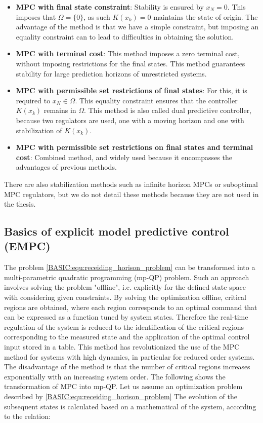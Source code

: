 \begin{itemize}
	\item \textbf{MPC with final state constraint}: Stability is ensured by $x_N=0$. This imposes that $\Omega=\{0\}$, as such $K(x_k)=0$ maintains the state of origin. The advantage of the method is that we have a simple constraint, but imposing an equality constraint can to lead to difficulties in obtaining the solution.
	\item \textbf{MPC with terminal cost}: This method imposes a zero terminal cost, without imposing restrictions
for the final states. This method guarantees stability for large prediction horizons
of unrestricted systems.
	\item \textbf{MPC with permissible set restrictions of final states}: For this, it is required to $x_N\in\Omega$. This equality constraint ensures that the controller $K(x_k)$ remains in $\Omega$. This method is also called dual predictive controller, because two regulators are used, one with a moving horizon and one with stabilization of $K(x_k)$.
	\item \textbf{MPC with permissible set restrictions on final states and terminal cost}: Combined method, and widely used because it encompasses the advantages of previous methods.
\end{itemize}

There are also stabilization methods such as infinite horizon MPCs or suboptimal MPC regulators, but we do not detail these methods because they are not used in the thesis.

\subsection{Basics of explicit model predictive control (EMPC)}

The problem \ref{BASIC:equ:receiding_horison_problem} can be transformed into a multi-parametric quadratic programming (mp-QP) problem. Such an approach involves solving the problem "offline", i.e. explicitly for the defined state-space with considering given constraints. By solving the optimization offline, critical regions are obtained, where each region corresponds to an optimal command that can be expressed as a function tuned by system states. Therefore the real-time regulation of the system is reduced to the identification of the critical regions corresponding to the measured state and the application of the optimal control input stored in a table. This method has revolutionized the use of the MPC method for systems with high dynamics, in particular for reduced order systems. The disadvantage of the method is that the number of critical regions increases exponentially with an increasing system order. The following shows the transformation of MPC into
mp-QP.
Let us assume an optimization problem described by \ref{BASIC:equ:receiding_horison_problem} The evolution of the subsequent states is calculated based on a mathematical of the system, according to the relation:

